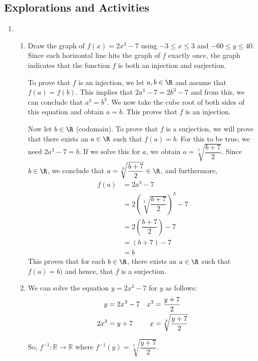 \subsection*{Explorations and Activities}
\setcounter{oldenumi}{\theenumi}
\begin{enumerate} \setcounter{enumi}{\theoldenumi}
\item \begin{enumerate}
\item Draw the graph of $f \left( x \right) = 2x^3 - 7$ using $-3 \leq x \leq 3$ and 
$-60 \leq y \leq 40$.  Since each horizontal line hits the graph of  $f$  exactly once, the graph indicates that the function  $f$  is both an injection and surjection.

\newpar
To prove that $f$ is an injection, we let $a, b \in \R$ and assume that $f(a) = f(b)$.  This implies that 
$2a^3 - 7 = 2b^3 - 7$ and from this, we can conclude that $a^3 = b^3$.  We now take the cube root of both sides of this equation and obtain $a = b$.  This proves that $f$ is an injection.

\newpar
Now let $b \in \R$ (codomain).  To prove that $f$ is a surjection, we will prove that there exists an $a \in \R$ such that $f(a) = b$.  For this to be true, we need $2a^3 - 7 = b$.  If we solve this for $a$, we obtain 
$a = \sqrt[3]{\dfrac{b + 7}{2}}$.  Since $b \in \R$, we conclude that $a = \sqrt[3]{\dfrac{b + 7}{2}} \in \R$, and furthermore,
\begin{align*}
f(a) &= 2a^3 - 7 \\
     &= 2 \left( \sqrt[3]{\dfrac{b + 7}{2}} \right)^3 - 7 \\
     &= 2 \left( \dfrac{b + 7}{2} \right) - 7 \\
     &= (b + 7) - 7 \\
     &= b
\end{align*}
This proves that for each $b \in \R$, there exists an $a \in \R$ such that $f(a) = b)$ and hence, that $f$ is a surjection.


\item We can solve the equation $y = 2x^3 - 7$ for $y$ as follows:
\begin{align}
  y &= 2x^3  - 7  &  x^3  &= \frac{{y + 7}}{2} \notag \\
2x^3 &= y + 7     &    x &= \sqrt[3]{{\frac{{y + 7}}{2}}} \notag
\end{align}

So,  $f^{ - 1} :\mathbb{R} \to \mathbb{R}$ where  
$f^{ - 1} \left( y \right) = \sqrt[3]{{\dfrac{{y + 7}}{2}}}$.


\end{enumerate}
\end{enumerate}
